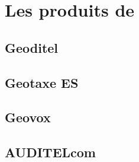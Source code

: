 \chapter{Les produits de \mbx{}}
	\section{Geoditel}
	\section{Geotaxe ES}
	\section{Geovox}
	\section{AUDITELcom}

\lipsum
